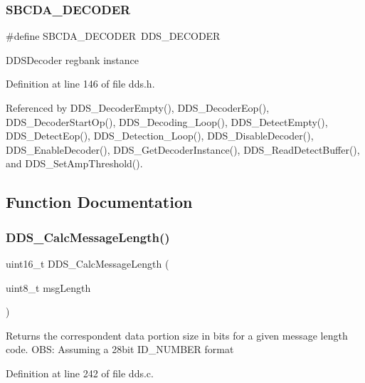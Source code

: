 \subsubsection{\texorpdfstring{S\+B\+C\+D\+A\+\_\+\+D\+E\+C\+O\+D\+ER}{SBCDA\_DECODER}}
{\footnotesize\ttfamily \#define S\+B\+C\+D\+A\+\_\+\+D\+E\+C\+O\+D\+ER~D\+D\+S\+\_\+\+D\+E\+C\+O\+D\+ER}

D\+D\+S\+Decoder regbank instance 

Definition at line 146 of file dds.\+h.



Referenced by D\+D\+S\+\_\+\+Decoder\+Empty(), D\+D\+S\+\_\+\+Decoder\+Eop(), D\+D\+S\+\_\+\+Decoder\+Start\+Op(), D\+D\+S\+\_\+\+Decoding\+\_\+\+Loop(), D\+D\+S\+\_\+\+Detect\+Empty(), D\+D\+S\+\_\+\+Detect\+Eop(), D\+D\+S\+\_\+\+Detection\+\_\+\+Loop(), D\+D\+S\+\_\+\+Disable\+Decoder(), D\+D\+S\+\_\+\+Enable\+Decoder(), D\+D\+S\+\_\+\+Get\+Decoder\+Instance(), D\+D\+S\+\_\+\+Read\+Detect\+Buffer(), and D\+D\+S\+\_\+\+Set\+Amp\+Threshold().



\subsection{Function Documentation}
\mbox{\label{group___d_d_s___a_p_i_ga3c1b6aafe67b4074170688cf170fad65}} 
\subsubsection{\texorpdfstring{D\+D\+S\+\_\+\+Calc\+Message\+Length()}{DDS\_CalcMessageLength()}}
{\footnotesize\ttfamily uint16\+\_\+t D\+D\+S\+\_\+\+Calc\+Message\+Length (\begin{DoxyParamCaption}\item[{uint8\+\_\+t}]{msg\+Length }\end{DoxyParamCaption})}

Returns the correspondent data portion size in bits for a given message length code. O\+BS\+: Assuming a 28bit I\+D\+\_\+\+N\+U\+M\+B\+ER format 

Definition at line 242 of file dds.\+c.

\mbox{\label{group___d_d_s___a_p_i_ga27670bb6491dd40f4c605dbec0bf505d}} 
